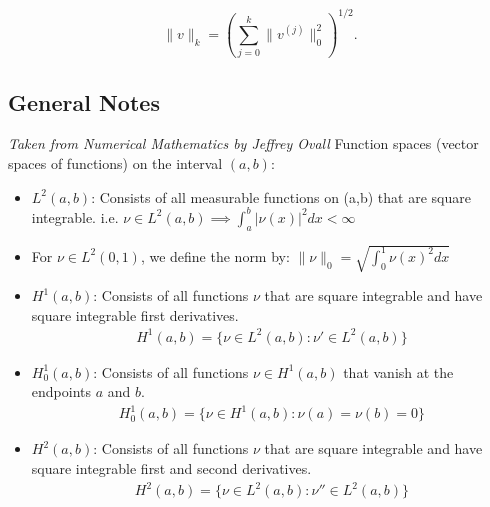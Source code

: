 \documentclass[../main.tex]{subfiles}
\begin{document}
\[
\|v\|_k
=
\left(
\sum_{j=0}^k \|v^{(j)}\|_0^2
\right)^{1/2}.
\]


\subsection{General Notes}
\textit{Taken from Numerical Mathematics by Jeffrey Ovall}
Function spaces (vector spaces of functions) on the interval $(a,b)$:
\begin{itemize}
    \item $L^2(a,b)$: Consists of all measurable functions on (a,b) that are square integrable. i.e. $\nu \in L^2(a,b) \implies \int_a^b |\nu(x)|^2 dx < \infty$
    \item For $\nu \in L^2(0,1)$, we define the norm by: $\|\nu\|_0 = \sqrt{\int_0^1 \nu(x)^2 dx}$
    \item $H^1(a,b)$: Consists of all functions $\nu$ that are square integrable and have square integrable first derivatives. 
        \begin{align*}
            H^1(a,b) = \{ \nu \in L^2(a,b): \nu' \in L^2(a,b) \}
        \end{align*}
    \item $H^1_0(a,b)$: Consists of all functions $\nu \in H^1(a,b)$ that vanish at the endpoints $a$ and $b$.
    \begin{align*}
        H^1_0(a,b) = \{ \nu \in H^1(a,b): \nu(a) = \nu(b) = 0 \}
    \end{align*}
    \item $H^2(a,b)$: Consists of all functions $\nu$ that are square integrable and have square integrable first and second derivatives.
    \begin{align*}
        H^2(a,b) = \{ \nu \in L^2(a,b):  \nu'' \in L^2(a,b) \}
    \end{align*}
\end{itemize}
\end{document}
